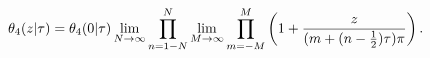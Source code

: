 \[\mathop{\theta_{4}\/}\nolimits\!\left(z\middle|\tau\right)=\mathop{\theta_{4}%
\/}\nolimits\!\left(0\middle|\tau\right)\*\lim_{N\to\infty}\prod_{n=1-N}^{N}%
\lim_{M\to\infty}\prod_{m=-M}^{M}\left(1+\frac{z}{(m+(n-\tfrac{1}{2})\tau)\pi}%
\right).\]